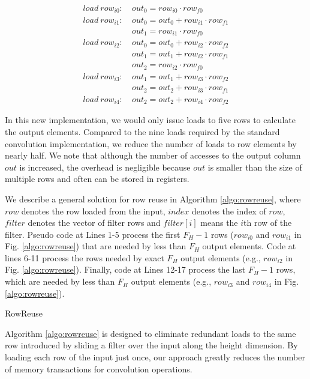 \begin{equation}\nonumber
\begin{aligned}
load\ row_{i0}:
&\ out_0=row_{i0} \cdot row_{f0} \\
load\ row_{i1}:
&\ out_0 = out_0+row_{i1} \cdot row_{f1}\\
&\ out_1=row_{i1} \cdot row_{f0}\\
load\ row_{i2}:
&\ out_0 = out_0+row_{i2} \cdot row_{f2}\\
&\ out_1 = out_1+row_{i2} \cdot row_{f1}\\
&\ out_{2}=row_{i2} \cdot row_{f0}\\
load\ row_{i3}:
&\ out_1=out_1+row_{i3} \cdot row_{f2} \\
&\ out_2=out_2+row_{i3} \cdot row_{f1}\\
load\ row_{i4}:
&\ out_2=out_2+row_{i4} \cdot row_{f2}
\end{aligned}	
\end{equation}

In this new implementation, we would only issue loads to five rows to calculate the output elements. Compared to the nine loads required by
the standard convolution implementation, we reduce the number of loads to row elements by nearly half. We note that although the number of
accesses to the output column $out$ is increased, the overhead is negligible because $out$ is smaller than the size of multiple rows and
often can be stored in registers.

We describe a general solution for row reuse in Algorithm \ref{algo:rowreuse}, where $row$ denotes the row loaded from the input, $index$ denotes the index of $row$, $filter$ denotes the vector of filter rows and $filter[i]$ means the $i$th row of the filter.
Pseudo code at Lines 1-5 process the first $F_H-1$ rows ($row_{i0}$ and $row_{i1}$ in Fig. \ref{algo:rowreuse}) that are needed by less than $F_H$ output elements.
Code at lines 6-11 process the rows needed by exact $F_H$ output elements (e.g., $row_{i2}$ in Fig. \ref{algo:rowreuse}).
Finally, code at Lines 12-17 process the last $F_H-1$ rows, which are needed by less than $F_H$ output elements (e.g., $row_{i3}$ and $row_{i4}$ in Fig. \ref{algo:rowreuse}).

\begin{algorithm}[t!]
\small
	\caption{RowReuse}
	\label{algo:rowreuse}
\end{algorithm}

Algorithm \ref{algo:rowreuse} is designed to eliminate redundant loads to the same row introduced by sliding a filter over the input along the height dimension.
By loading each row of the input just once, our approach greatly reduces the number of memory transactions for convolution operations.
